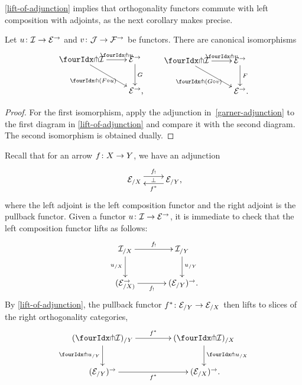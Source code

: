 \documentclass[reqno,10pt,a4paper,oneside,draft]{amsart}
\begin{document}
\cref{lift-of-adjunction} implies that orthogonality functors commute with left composition with adjoints, as the next corollary makes precise.

\begin{corollary} \label{pitchfork-adjunction}
Let $u \colon \mathcal{I} \to \mathcal{E}^\to$ and $v \colon \mathcal{J} \to \mathcal{F}^\to$ be functors.
There are canonical isomorphisms
\begin{align*}
\xycenter{
\liftr{\cal{I}} \ar[dr]_-{\liftr{(F \cc u)}}  \ar[r]^-{\liftr{u}} & \catE^\to \ar[d]^-G \\
& \catE^\to \rlap{,} }  \qquad
\xycenter{
 \liftl{\cal{I}}  \ar[r]^-{\liftl{v}} \ar[dr]_-{\liftl{(G \cc v)}}  & \catE^\to \ar[d]^-{F}   \\
& \catE^\to \rlap{.}  }
\end{align*}
\end{corollary}

\begin{proof}
For the first isomorphism, apply the adjunction in~\eqref{garner-adjunction} to the first diagram in \cref{lift-of-adjunction} and compare it with the second diagram.
The second isomorphism is obtained dually.
\end{proof}

\begin{example} \label{exa:composition-pullback-lift}
Recall that for an arrow $f \colon X \to Y$, we have an adjunction
\[
\xymatrix{
\catE_{/X} \ar@<1ex>[r]^{f_{!}} \ar@{}[r]|{\bot} & \catE_{/Y} \rlap{,} \ar@<1ex>[l]^{f^*}}
\]
where the left adjoint is the left composition functor and the right adjoint is the pullback functor.
Given a functor $u \colon \mathcal{I} \to \mathcal{E}^\to$, it is immediate to check that the left composition functor lifts as follows:
\[
\xymatrix@C+1em{
  \cal{I}_{/X}
  \ar[r]^-{f_!}
  \ar[d]_{u_{/X}}
&
  \cal{I}_{/Y}
  \ar[d]^{u_{/Y}}
\\
  (\calE_{/X)}^\to
  \ar[r]_-{f_!}
&
  (\calE_{/Y})^\to \rlap{.}
}
\]
By \cref{lift-of-adjunction}, the pullback functor $f^* \colon \mathcal{E}_{/Y} \to \mathcal{E}_{/X}$ then lifts to slices of the right orthogonality categories,
\[
\xymatrix@C=1.5cm{
   (\liftr{\cal{I}})_{/ Y}
 \ar[d]_{{\liftr{u}}_{/Y}}
  \ar[r]^{f^*}
&
  (\liftr{\cal{I}})_{/X}
 \ar[d]^{{\liftr{u}}_{/X}}
\\
 ({\catE}_{/Y})^\to
  \ar[r]_{f^*}
&
   (\catE_{/X})^\to \rlap{.}
}
\]
\end{example}

\end{document}
